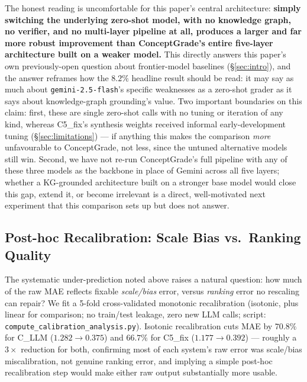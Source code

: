 \documentclass[conference]{IEEEtran}
\begin{document}
The honest reading is uncomfortable for this paper's central
architecture: \textbf{simply switching the underlying zero-shot model,
with no knowledge graph, no verifier, and no multi-layer pipeline at
all, produces a larger and far more robust improvement than
ConceptGrade's entire five-layer architecture built on a weaker
model.} This directly answers this paper's own previously-open
question about frontier-model baselines (\S\ref{sec:intro}), and the
answer reframes how the $8.2\%$ headline result should be read: it may
say as much about \texttt{gemini-2.5-flash}'s specific weaknesses as a
zero-shot grader as it says about knowledge-graph grounding's value.
Two important boundaries on this claim: first, these are single
zero-shot calls with no tuning or iteration of any kind, whereas
C5\_fix's synthesis weights received informal early-development tuning
(\S\ref{sec:limitations}) --- if anything this makes the comparison
\emph{more} unfavourable to ConceptGrade, not less, since the
untuned alternative models still win. Second, we have not re-run
ConceptGrade's full pipeline with any of these three models as the
backbone in place of Gemini across all five layers; whether a
KG-grounded architecture built on a stronger base model would close
this gap, extend it, or become irrelevant is a direct, well-motivated
next experiment that this comparison sets up but does not answer.

\subsection{Post-hoc Recalibration: Scale Bias vs.\ Ranking Quality}
\label{subsec:calibration}

The systematic under-prediction noted above raises a natural question:
how much of the raw MAE reflects fixable \emph{scale/bias} error,
versus \emph{ranking} error no rescaling can repair? We fit a 5-fold
cross-validated monotonic recalibration (isotonic, plus linear for
comparison; no train/test leakage, zero new LLM calls; script:
\texttt{compute\_calibration\_analysis.py}). Isotonic recalibration
cuts MAE by $70.8\%$ for C\_LLM ($1.282 \to 0.375$) and $66.7\%$ for
C5\_fix ($1.177 \to 0.392$) --- roughly a $3\times$ reduction for both,
confirming most of each system's raw error was scale/bias
miscalibration, not genuine ranking error, and implying a simple
post-hoc recalibration step would make either raw output
substantially more usable.
\end{document}
